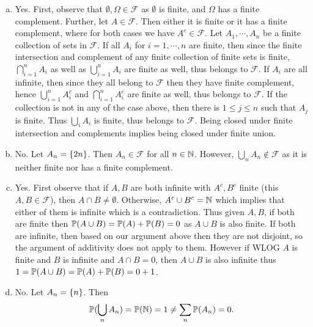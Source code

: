 \begin{solution}
	\begin{enumerate}[(a)]
		\item Yes. First, observe that $ \emptyset, \Omega \in \mathcal{F} $ as $ \emptyset $ is finite, and $ \Omega $ has a finite complement. Further, let $ A \in \mathcal{F} $. Then either it is finite or it has a finite complement, where for both cases we have $ A^c \in \mathcal{F} $. Let $ A_1,\cdots,A_n $ be a finite collection of sets in $ \mathcal{F} $. If all $ A_i $ for $ i=1,\cdots,n $ are finite, then since the finite intersection and complement of any finite collection of finite sets is finite, $ \bigcap_{i=1}^n A_i $ as well as $ \bigcup_{i=1}^n A_i$ are finite as well, thus belongs to $ \mathcal{F} $. If $ A_i $ are all infinite, then since they all belong to $ \mathcal{F} $ then they have finite complement, hence $ \bigcup_{i=1}^n A_i^c $ and $ \bigcap_{i=1}^n A_i^c $ are finite as well, thus belongs to $ \mathcal{F} $. If the collection is not in any of the case above, then there is $ 1\leq j \leq n $ such that $ A_j $ is finite. Thus $ \bigcup_i A_i $ is finite, thus belongs to $ \mathcal{F} $. Being closed under finite intersection and complements implies being closed under finite union.
		
		\item No. Let $ A_n = \{2n\} $. Then $ A_n \in \mathcal{F} $ for all $ n\in\mathbb{N} $. However, $ \bigcup_n A_n \notin \mathcal{F} $ as it is neither finite nor has a finite complement.
		
		\item Yes. First observe that if $ A,B $ are both infinite with $ A^c, B^c $ finite (this $ A,B \in \mathcal{F} $), then $ A\cap B \neq\emptyset $. Otherwise, $ A^c \cup B^c = \mathbb{N} $ which implies that either of them is infinite which is a contradiction. Thus given $ A,B $, if both are finite then $ \mathbb{P}(A\cup B) = \mathbb{P}(A) + \mathbb{P}(B) = 0 $ as $ A\cup B $ is also finite. If both are infinite, then based on our argument above then they are not disjoint, so the argument of additivity does not apply to them. However if WLOG $ A $ is finite and $ B $ is infinite and $ A\cap B = 0 $, then $ A\cup B $ is also infinite thus $ 1 = \mathbb{P}(A\cup B) = \mathbb{P}(A) + \mathbb{P}(B) = 0 + 1 $.
		
		\item No. Let $ A_n = \{n\} $. Then 
		\[ \mathbb{P}(\bigcup_n A_n) = \mathbb{P}(\mathbb{N}) = 1 \neq \sum_n \mathbb{P}(A_n) = 0. \]
	\end{enumerate}
	
\end{solution}

